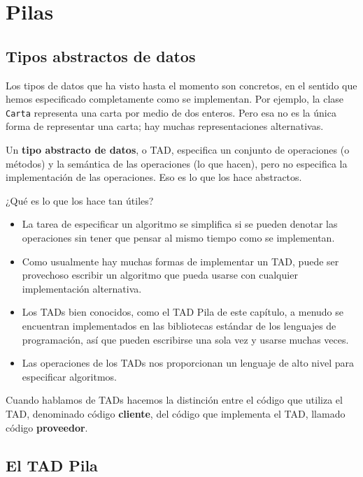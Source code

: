 
\chapter{Pilas}

\section{Tipos abstractos de datos}

  

Los tipos de datos que ha visto hasta el momento son concretos, en
el sentido que hemos especificado completamente como se implementan.
Por ejemplo, la clase \texttt{Carta} representa una carta por medio
de dos enteros. Pero esa no es la única forma de representar una carta;
hay muchas representaciones alternativas.

Un \textbf{tipo abstracto de datos}, o TAD, especifica un conjunto
de operaciones (o métodos) y la semántica de las operaciones (lo que
hacen), pero no especifica la implementación de las operaciones. Eso
es lo que los hace abstractos.

¿Qué es lo que los hace tan útiles?
\begin{itemize}
\item La tarea de especificar un algoritmo se simplifica si se pueden denotar
las operaciones sin tener que pensar al mismo tiempo como se implementan.
\item Como usualmente hay muchas formas de implementar un TAD, puede ser
provechoso escribir un algoritmo que pueda usarse con cualquier implementación
alternativa.
\item Los TADs bien conocidos, como el TAD Pila de este capítulo, a menudo
se encuentran implementados en las bibliotecas estándar de los lenguajes
de programación, así que pueden escribirse una sola vez y usarse muchas
veces.
\item Las operaciones de los TADs nos proporcionan un lenguaje de alto nivel
para especificar algoritmos.
\end{itemize}
Cuando hablamos de TADs hacemos la distinción entre el código que
utiliza el TAD, denominado código \textbf{cliente}, del código que
implementa el TAD, llamado código \textbf{proveedor}.

 

\section{El TAD Pila}

